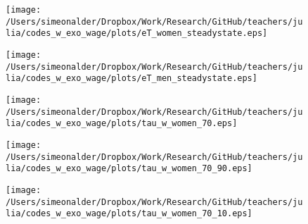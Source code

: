 \documentclass[11pt]{beamer}
\begin{document}
\begin{frame}
\begin{figure}
\begin{center}
\texttt{[image: /Users/simeonalder/Dropbox/Work/Research/GitHub/teachers/julia/codes\_w\_exo\_wage/plots/eT\_women\_steadystate.eps]}
\label{ }
\end{center}
\end{figure}
\end{frame}

\begin{frame}
\begin{figure}
\begin{center}
\texttt{[image: /Users/simeonalder/Dropbox/Work/Research/GitHub/teachers/julia/codes\_w\_exo\_wage/plots/eT\_men\_steadystate.eps]}
\label{ }
\end{center}
\end{figure}
\end{frame}

\begin{frame}
\begin{figure}
\begin{center}
\texttt{[image: /Users/simeonalder/Dropbox/Work/Research/GitHub/teachers/julia/codes\_w\_exo\_wage/plots/tau\_w\_women\_70.eps]}
\label{ }
\end{center}
\end{figure}
\end{frame}

\begin{frame}
\begin{figure}
\begin{center}
\texttt{[image: /Users/simeonalder/Dropbox/Work/Research/GitHub/teachers/julia/codes\_w\_exo\_wage/plots/tau\_w\_women\_70\_90.eps]}
\label{ }
\end{center}
\end{figure}
\end{frame}

\begin{frame}
\begin{figure}
\begin{center}
\texttt{[image: /Users/simeonalder/Dropbox/Work/Research/GitHub/teachers/julia/codes\_w\_exo\_wage/plots/tau\_w\_women\_70\_10.eps]}
\label{ }
\end{center}
\end{figure}
\end{frame}
\end{document}
